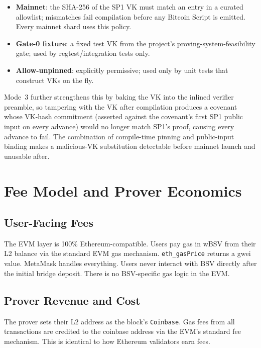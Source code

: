 \documentclass[11pt,twocolumn]{article}
\begin{document}
\begin{itemize}[nosep,leftmargin=1.5em]
\item \textbf{Mainnet}: the SHA-256 of the SP1 VK must match an entry in a curated allowlist; mismatches fail compilation before any Bitcoin Script is emitted. Every mainnet shard uses this policy.
\item \textbf{Gate-0 fixture}: a fixed test VK from the project's proving-system-feasibility gate; used by regtest/integration tests only.
\item \textbf{Allow-unpinned}: explicitly permissive; used only by unit tests that construct VKs on the fly.
\end{itemize}

Mode~3 further strengthens this by baking the VK into the inlined verifier preamble, so tampering with the VK after compilation produces a covenant whose VK-hash commitment (asserted against the covenant's first SP1 public input on every advance) would no longer match SP1's proof, causing every advance to fail. The combination of compile-time pinning and public-input binding makes a malicious-VK substitution detectable before mainnet launch and unusable after.

\section{Fee Model and Prover Economics}
\label{sec:fees}

\subsection{User-Facing Fees}

The EVM layer is 100\% Ethereum-compatible. Users pay gas in wBSV from their L2 balance via the standard EVM gas mechanism. \texttt{eth\_gasPrice} returns a gwei value. MetaMask handles everything. Users never interact with BSV directly after the initial bridge deposit. There is no BSV-specific gas logic in the EVM.

\subsection{Prover Revenue and Cost}

The prover sets their L2 address as the block's \texttt{Coinbase}. Gas fees from all transactions are credited to the coinbase address via the EVM's standard fee mechanism. This is identical to how Ethereum validators earn fees.
\end{document}
